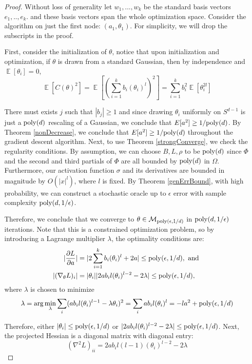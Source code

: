 \documentclass{article}
\DeclareMathOperator*{\expt}{\mathbb{E}}
\newcommand{\pd}[2]{\frac{\partial#1}{\partial#2}}
\begin{document}
\begin{proof}
Without loss of generality let $w_1,...,w_k$ be the standard basis vectors $e_1,..,e_k$. and these basis vectors span the whole optimization space. Consider the algorithm on just the first node: $(a_1,\theta_1)$. For simplicity, we will drop the subscripts in the proof. 

First, consider the initialization of $\theta$, notice that upon initialization and optimization, if $\theta$ is drawn from a standard Gaussian, then by independence and $\expt[\theta_i] = 0$,
%
\[\expt[C(\theta)^2] = \expt\left[\left(\sum_{i=1}^k  b_i (\theta_i)^l\right)^2\right] = \sum_{i=1}^k b_i^2 \expt[\theta_i^{2l}]\]

There must exists $j$ such that $|b_j|\geq 1$ and since drawing $\theta_i$ uniformly on $S^{d-1}$ is just a $\mathrm{poly}(d)$ rescaling of a Gaussian, we conclude that $E[a^2]\geq1/\mathrm{poly}(d)$. By Theorem \ref{nonDecrease}, we conclude that $E[a^2] \geq 1/\mathrm{poly}(d)$ throughout the gradient descent algorithm. Next, to use Theorem \ref{strongConverge}, we check the regularity conditions. By assumption, we can choose $B, L, \rho$ to be $\mathrm{poly}(d)$ since $\Phi$ and the second and third partials of $\Phi$ are all bounded by $\mathrm{poly}(d)$ in $\Omega$. Furthermore, our activation function $\sigma$ and its derivatives are bounded in magnitude by $O(|x|^{l})$, where $l$ is fixed. By Theorem \ref{genErrBound}, with high probability, we can construct a stochastic oracle up to $\epsilon$ error with sample complexity $\mathrm{poly}(d,1/\epsilon)$.


Therefore, we conclude that we converge to $\theta \in \mathcal{M}_{\mathrm{poly}(\epsilon,1/d)}$ in $\mathrm{poly}(d,1/\epsilon)$ iterations. Note that this is a constrained optimization problem, so by introducing a Lagrange multiplier $\lambda$, the optimality conditions are:
%
\begin{align*}
|\pd{L}{a}| & = |2\sum_{i=1}^k b_i (\theta_i)^l + 2a| \leq \poly(\epsilon,1/d), \textrm{ and } \\
%
 |(\nabla_\theta L)_i| & = |\theta_i||2ab_il(\theta_i)^{l-2}  -2\lambda| \leq \poly(\epsilon,1/d) ,
\end{align*}
where $\lambda$ is chosen to minimize
\[\lambda = \arg \min_\lambda \sum_i (ab_i l (\theta_i)^{l-1} - \lambda\theta_i)^2 = \sum_i ab_i l (\theta_i)^l = -la^2 + \mathrm{poly}(\epsilon,1/d) \]

Therefore, either $|\theta_i| \leq \mathrm{poly}(\epsilon,1/d)$ or $|2ab_il(\theta_i)^{l-2} - 2 \lambda |\leq \mathrm{poly}(\epsilon,1/d)$. Next, the projected Hessian is a diagonal matrix with diagonal entry: 
%
\[(\nabla^2 L)_{ii} = 2a b_i l(l-1)(\theta_i)^{l-2} - 2 \lambda\]


\end{proof}
\end{document}
